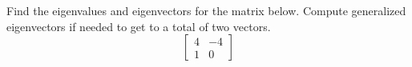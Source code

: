 \documentclass{ximera}
\begin{document}
\begin{exercise}%
    Find the eigenvalues and eigenvectors for the matrix below. Compute generalized eigenvectors if needed to get to a total of two vectors. 
    \[ \begin{bmatrix} 4 & -4 \\ 1 & 0 \end{bmatrix} \]
\end{exercise}
\end{document}
